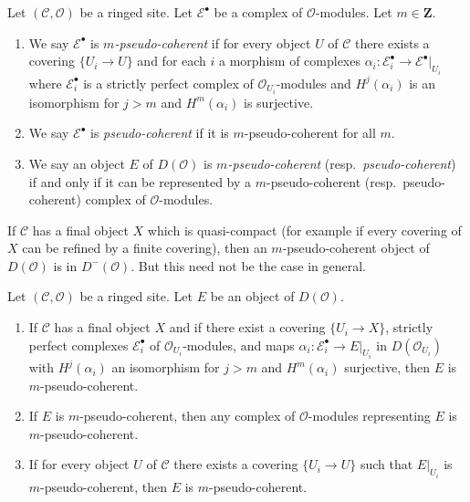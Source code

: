 \begin{definition}
\label{definition-pseudo-coherent}
Let $(\mathcal{C}, \mathcal{O})$ be a ringed site. Let $\mathcal{E}^\bullet$
be a complex of $\mathcal{O}$-modules. Let $m \in \mathbf{Z}$.
\begin{enumerate}
\item We say $\mathcal{E}^\bullet$ is {\it $m$-pseudo-coherent}
if for every object $U$ of $\mathcal{C}$ there exists a covering
$\{U_i \to U\}$ and for each $i$ a morphism of complexes
$\alpha_i : \mathcal{E}_i^\bullet \to \mathcal{E}^\bullet|_{U_i}$
where $\mathcal{E}_i^\bullet$ is a strictly perfect complex of
$\mathcal{O}_{U_i}$-modules and $H^j(\alpha_i)$ is an isomorphism
for $j > m$ and $H^m(\alpha_i)$ is surjective.
\item We say $\mathcal{E}^\bullet$ is {\it pseudo-coherent}
if it is $m$-pseudo-coherent for all $m$.
\item We say an object $E$ of $D(\mathcal{O})$ is
{\it $m$-pseudo-coherent} (resp.\ {\it pseudo-coherent})
if and only if it can be represented by a $m$-pseudo-coherent
(resp.\ pseudo-coherent) complex of $\mathcal{O}$-modules.
\end{enumerate}
\end{definition}

\noindent
If $\mathcal{C}$ has a final object $X$ which is quasi-compact
(for example if every covering of $X$ can be refined by a finite covering),
then an $m$-pseudo-coherent object of $D(\mathcal{O})$ is in
$D^-(\mathcal{O})$. But this need not be the case in general.

\begin{lemma}
\label{lemma-pseudo-coherent-independent-representative}
Let $(\mathcal{C}, \mathcal{O})$ be a ringed site.
Let $E$ be an object of $D(\mathcal{O})$.
\begin{enumerate}
\item If $\mathcal{C}$ has a final object $X$ and if there exist a covering
$\{U_i \to X\}$, strictly perfect complexes $\mathcal{E}_i^\bullet$ of
$\mathcal{O}_{U_i}$-modules, and
maps $\alpha_i : \mathcal{E}_i^\bullet \to E|_{U_i}$ in
$D(\mathcal{O}_{U_i})$ with $H^j(\alpha_i)$ an isomorphism for $j > m$
and $H^m(\alpha_i)$ surjective, then $E$ is $m$-pseudo-coherent.
\item If $E$ is $m$-pseudo-coherent, then any complex of $\mathcal{O}$-modules
representing $E$ is $m$-pseudo-coherent.
\item If for every object $U$ of $\mathcal{C}$ there exists a covering
$\{U_i \to U\}$ such that $E|_{U_i}$ is $m$-pseudo-coherent, then
$E$ is $m$-pseudo-coherent.
\end{enumerate}
\end{lemma}

